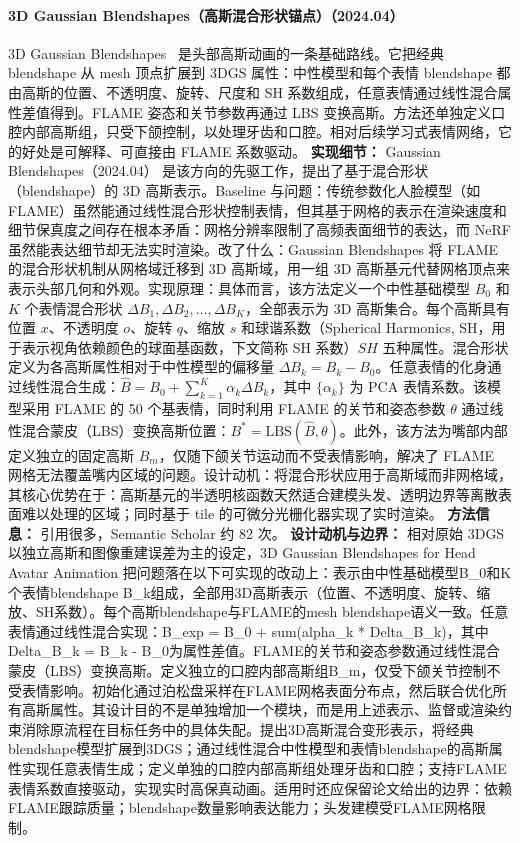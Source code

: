 \paragraph{3D Gaussian Blendshapes（高斯混合形状锚点）（2024.04）}
3D Gaussian Blendshapes~\cite{2404_19398} 是头部高斯动画的一条基础路线。它把经典 blendshape 从 mesh 顶点扩展到 3DGS 属性：中性模型和每个表情 blendshape 都由高斯的位置、不透明度、旋转、尺度和 SH 系数组成，任意表情通过线性混合属性差值得到。FLAME 姿态和关节参数再通过 LBS 变换高斯。方法还单独定义口腔内部高斯组，只受下颌控制，以处理牙齿和口腔。相对后续学习式表情网络，它的好处是可解释、可直接由 FLAME 系数驱动。
\textbf{实现细节：} Gaussian Blendshapes（2024.04） 是该方向的先驱工作，提出了基于混合形状（blendshape）的 3D 高斯表示。Baseline 与问题：传统参数化人脸模型（如 FLAME）虽然能通过线性混合形状控制表情，但其基于网格的表示在渲染速度和细节保真度之间存在根本矛盾：网格分辨率限制了高频表面细节的表达，而 NeRF 虽然能表达细节却无法实时渲染。改了什么：Gaussian Blendshapes 将 FLAME 的混合形状机制从网格域迁移到 3D 高斯域，用一组 3D 高斯基元代替网格顶点来表示头部几何和外观。实现原理：具体而言，该方法定义一个中性基础模型 $B_0$ 和 $K$ 个表情混合形状 $\Delta B_1, \Delta B_2, \ldots, \Delta B_K$，全部表示为 3D 高斯集合。每个高斯具有位置 $x$、不透明度 $o$、旋转 $q$、缩放 $s$ 和球谐系数（Spherical Harmonics, SH，用于表示视角依赖颜色的球面基函数，下文简称 SH 系数）$SH$ 五种属性。混合形状定义为各高斯属性相对于中性模型的偏移量 $\Delta B_k = B_k - B_0$。任意表情的化身通过线性混合生成：$\hat{B} = B_0 + \sum_{k=1}^{K} \alpha_k \Delta B_k$，其中 $\{\alpha_k\}$ 为 PCA 表情系数。该模型采用 FLAME 的 50 个基表情，同时利用 FLAME 的关节和姿态参数 $\theta$ 通过线性混合蒙皮（LBS）变换高斯位置：$B^{*} = \mathrm{LBS}(\hat{B}, \theta)$。此外，该方法为嘴部内部定义独立的固定高斯 $B_m$，仅随下颌关节运动而不受表情影响，解决了 FLAME 网格无法覆盖嘴内区域的问题。设计动机：将混合形状应用于高斯域而非网格域，其核心优势在于：高斯基元的半透明核函数天然适合建模头发、透明边界等离散表面难以处理的区域；同时基于 tile 的可微分光栅化器实现了实时渲染。
\textbf{方法信息：} 引用很多，Semantic Scholar 约 82 次。
\textbf{设计动机与边界：} 相对原始 3DGS 以独立高斯和图像重建误差为主的设定，3D Gaussian Blendshapes for Head Avatar Animation 把问题落在以下可实现的改动上：表示由中性基础模型B\_0和K个表情blendshape B\_k组成，全部用3D高斯表示（位置、不透明度、旋转、缩放、SH系数）。每个高斯blendshape与FLAME的mesh blendshape语义一致。任意表情通过线性混合实现：B\_exp = B\_0 + sum(alpha\_k * Delta\_B\_k)，其中Delta\_B\_k = B\_k - B\_0为属性差值。FLAME的关节和姿态参数通过线性混合蒙皮（LBS）变换高斯。定义独立的口腔内部高斯组B\_m，仅受下颌关节控制不受表情影响。初始化通过泊松盘采样在FLAME网格表面分布点，然后联合优化所有高斯属性。其设计目的不是单独增加一个模块，而是用上述表示、监督或渲染约束消除原流程在目标任务中的具体失配。提出3D高斯混合变形表示，将经典blendshape模型扩展到3DGS；通过线性混合中性模型和表情blendshape的高斯属性实现任意表情生成；定义单独的口腔内部高斯组处理牙齿和口腔；支持FLAME表情系数直接驱动，实现实时高保真动画。适用时还应保留论文给出的边界：依赖FLAME跟踪质量；blendshape数量影响表达能力；头发建模受FLAME网格限制。
